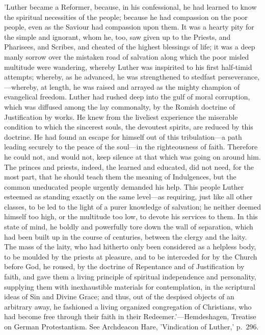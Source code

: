 \documentclass[
]{book}
\begin{document}
{  'Luther became a Reformer, because, in his confessional, he had learned to know the spiritual necessities of the people; because he had compassion on the poor people, even as the Saviour had compassion upon them. It was a hearty pity for the simple and ignorant, whom he, too, saw given up to the Priests, and Pharisees, and Scribes, and cheated of the highest blessings of life; it was a deep manly sorrow over the mistaken road of salvation along which the poor misled multitude were wandering, whereby Luther was inspirited to his first half-timid attempts; whereby, as he advanced, he was strengthened to stedfast perseverance,---whereby, at length, he was raised and arrayed as the mighty champion of evangelical freedom. Luther had rushed deep into the gulf of moral corruption, which was diffused among the lay commonalty, by the Romish doctrine of Justification by works. He knew from the liveliest experience the miserable condition to which the sincerest souls, the devoutest spirits, are reduced by this doctrine. He had found an escape for himself out of this tribulation---a path leading securely to the peace of the soul---in the righteousness of faith. Therefore he could not, and would not, keep silence at that which was going on around him. The princes and priests, indeed, the learned and educated, did not need, for the most part, that he should teach them the meaning of Indulgences, but the common uneducated people urgently demanded his help. This people Luther esteemed as standing exactly on the same level---as requiring, just like all other classes, to be led to the light of a purer knowledge of salvation; he neither deemed himself too high, or the multitude too low, to devote his services to them. In this state of mind, he boldly and powerfully tore down the wall of separation, which had been built up in the course of centuries, between the clergy and the laity. The mass of the laity, who had hitherto only been considered as a helpless body, to be moulded by the priests at pleasure, and to be interceded for by the Church before God, he roused, by the doctrine of Repentance and of Justification by faith, and gave them a living principle of spiritual independence and personality, supplying them with inexhaustible materials for contemplation, in the scriptural ideas of Sin and Divine Grace; and thus, out of the despised objects of an arbitrary away, he fashioned a living organized congregation of Christians, who had become free through their faith in their Redeemer.'---Hemdeshagen, Treatise on German Protestantism. See Archdeacon Hare, 'Vindication of Luther,' p.~296.

}
\end{document}
